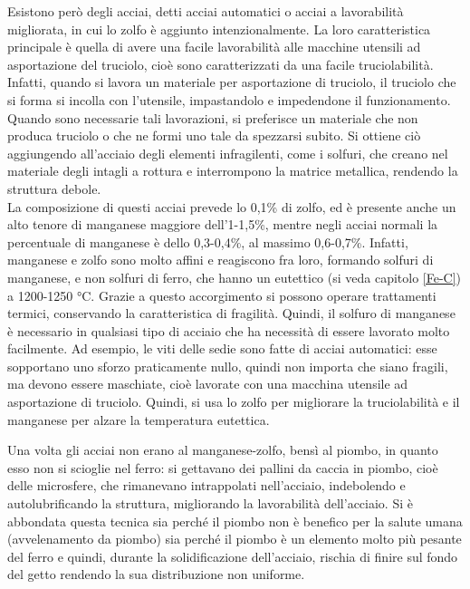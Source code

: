 Esistono però degli acciai, detti acciai automatici o acciai a lavorabilità migliorata, in cui lo zolfo è aggiunto intenzionalmente. La loro caratteristica principale è quella di avere una facile lavorabilità alle macchine utensili ad asportazione del truciolo, cioè sono caratterizzati da una facile truciolabilità. Infatti, quando si lavora un materiale per asportazione di truciolo, il truciolo che si forma si incolla con l’utensile, impastandolo e impedendone il funzionamento. Quando sono necessarie tali lavorazioni, si preferisce un materiale che non produca truciolo o che ne formi uno tale da spezzarsi subito. Si ottiene ciò aggiungendo all’acciaio degli elementi infragilenti, come i solfuri, che creano nel materiale degli intagli a rottura e interrompono la matrice metallica, rendendo la struttura debole.\\
La composizione di questi acciai prevede lo 0,1\% di zolfo, ed è presente anche un alto tenore di manganese maggiore dell’1-1,5\%, mentre negli acciai normali la percentuale di manganese è dello 0,3-0,4\%, al massimo 0,6-0,7\%. Infatti, manganese e zolfo sono molto affini e reagiscono fra loro, formando solfuri di manganese, e non solfuri di ferro, che hanno un eutettico (si veda capitolo \ref{Fe-C}) a 1200-1250 °C. Grazie a questo accorgimento si possono operare trattamenti termici, conservando la caratteristica di fragilità. Quindi, il solfuro di manganese è necessario in qualsiasi tipo di acciaio che ha necessità di essere lavorato molto facilmente. Ad esempio, le viti delle sedie sono fatte di acciai automatici: esse sopportano uno sforzo praticamente nullo, quindi non importa che siano fragili, ma devono essere maschiate, cioè lavorate con una macchina utensile ad asportazione di truciolo. Quindi, si usa lo zolfo per migliorare la truciolabilità e il manganese per alzare la temperatura eutettica.

Una volta gli acciai non erano al manganese-zolfo, bensì al piombo, in quanto esso non si scioglie nel ferro: si gettavano dei pallini da caccia in piombo, cioè delle microsfere, che rimanevano intrappolati nell’acciaio, indebolendo e autolubrificando la struttura, migliorando la lavorabilità dell’acciaio. Si è abbondata questa tecnica sia perché il piombo non è benefico per la salute umana (avvelenamento da piombo) sia perché il piombo è un elemento molto più pesante del ferro e quindi, durante la solidificazione dell’acciaio, rischia di finire sul fondo del getto rendendo la sua distribuzione non uniforme.

